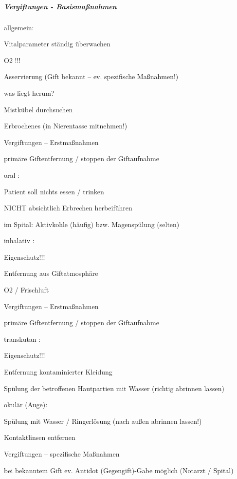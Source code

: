 \begin{gMassnahmenEnv}
\subparagraph*{Vergiftungen - Basisma{\ss}nahmen}

{\mdseries
allgemein:}

{\mdseries
Vitalparameter ständig \"uberwachen}

{\mdseries
O2  !!!}

{\mdseries
Asservierung (Gift bekannt -- ev. spezifische  Ma{\ss}nahmen!)}

{\mdseries
was liegt herum?}

{\mdseries
Mistk\"ubel durchsuchen}

{\mdseries
Erbrochenes (in Nierentasse mitnehmen!)}

{\mdseries
Vergiftungen -- Erstma{\ss}nahmen}

{\mdseries
primäre Giftentfernung / stoppen der Giftaufnahme}

{\mdseries
oral : }

{\mdseries
Patient soll nichts essen / trinken}

{\mdseries
NICHT absichtlich Erbrechen herbeif\"uhren}

{\mdseries
im Spital: Aktivkohle (häufig) bzw.  Magensp\"ulung (selten)}

{\mdseries
inhalativ :}

{\mdseries
Eigenschutz!!!}

{\mdseries
Entfernung aus Giftatmosphäre}

{\mdseries
O2  / Frischluft}

{\mdseries
Vergiftungen -- Erstma{\ss}nahmen}

{\mdseries
primäre Giftentfernung / stoppen der Giftaufnahme}

{\mdseries
transkutan :}

{\mdseries
Eigenschutz!!!}

{\mdseries
Entfernung kontaminierter Kleidung}

{\mdseries
Sp\"ulung der betroffenen Hautpartien mit Wasser  (richtig abrinnen
lassen)}

{\mdseries
okulär  (Auge):}

{\mdseries
Sp\"ulung mit Wasser / Ringerlösung (nach au{\ss}en abrinnen lassen!)}

{\mdseries
Kontaktlinsen entfernen}

{\mdseries
Vergiftungen -- spezifische  Ma{\ss}nahmen}

{\mdseries
bei bekanntem Gift ev. Antidot  (Gegengift)-Gabe möglich (Notarzt / 
Spital)}
\end{gMassnahmenEnv}

